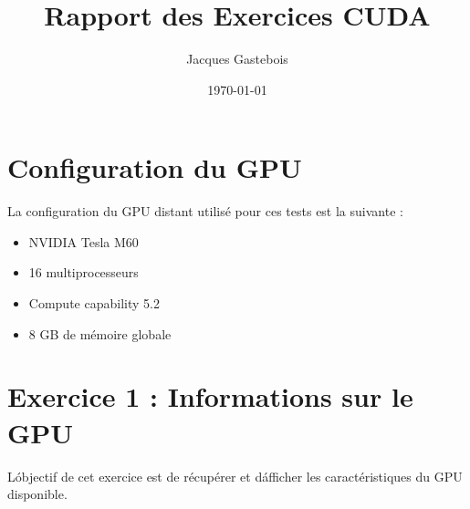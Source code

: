 \documentclass[a4paper,11pt]{article}
\title{Rapport des Exercices CUDA}
\author{Jacques Gastebois}
\date{\today}
\begin{document}
\maketitle
\tableofcontents
\newpage

\section{Configuration du GPU}
La configuration du GPU distant utilisé pour ces tests est la suivante :
\begin{itemize}
    \item NVIDIA Tesla M60
    \item 16 multiprocesseurs
    \item Compute capability 5.2
    \item 8 GB de mémoire globale
\end{itemize}

\section{Exercice 1 : Informations sur le GPU}
L\'objectif de cet exercice est de récupérer et d\'afficher les caractéristiques du GPU disponible.
\end{document}
